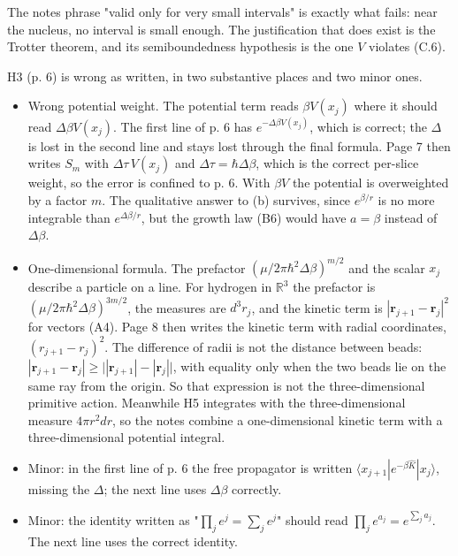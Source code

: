 \documentclass[11pt,a4paper]{article}
\providecommand{\tightlist}{\setlength{\itemsep}{0pt}\setlength{\parskip}{0pt}}
\begin{document}
The notes\textquotesingle{} phrase "valid only for very small intervals" is exactly what fails: near the nucleus, no interval is small enough. The justification that does exist is the Trotter theorem, and its semiboundedness hypothesis is the one \(V\) violates (C.6).

H3 (p. 6) is wrong as written, in two substantive places and two minor ones.

\begin{itemize}
\tightlist
\item
  Wrong potential weight. The potential term reads \(\beta V(x_j)\) where it should read \(\Delta\beta V(x_j)\). The first line of p. 6 has \(e^{-\Delta\beta V(x_j)}\), which is correct; the \(\Delta\) is lost in the second line and stays lost through the final formula. Page 7 then writes \(S_m\) with \(\Delta\tau\,V(x_j)\) and \(\Delta\tau=\hbar\Delta\beta\), which is the correct per-slice weight, so the error is confined to p. 6. With \(\beta V\) the potential is overweighted by a factor \(m\). The qualitative answer to (b) survives, since \(e^{\beta/r}\) is no more integrable than \(e^{\Delta\beta/r}\), but the growth law (B6) would have \(a=\beta\) instead of \(\Delta\beta\).
\item
  One-dimensional formula. The prefactor \((\mu/2\pi\hbar^2\Delta\beta)^{m/2}\) and the scalar \(x_j\) describe a particle on a line. For hydrogen in \(\mathbb R^3\) the prefactor is \((\mu/2\pi\hbar^2\Delta\beta)^{3m/2}\), the measures are \(d^3r_j\), and the kinetic term is \(|\mathbf r_{j+1}-\mathbf r_j|^2\) for vectors (A4). Page 8 then writes the kinetic term with radial coordinates, \((r_{j+1}-r_j)^2\). The difference of radii is not the distance between beads: \(|\mathbf r_{j+1}-\mathbf r_j|\ge\big||\mathbf r_{j+1}|-|\mathbf r_j|\big|\), with equality only when the two beads lie on the same ray from the origin. So that expression is not the three-dimensional primitive action. Meanwhile H5 integrates with the three-dimensional measure \(4\pi r^2dr\), so the notes combine a one-dimensional kinetic term with a three-dimensional potential integral.
\item
  Minor: in the first line of p. 6 the free propagator is written \(\langle x_{j+1}|e^{-\beta\hat K}|x_j\rangle\), missing the \(\Delta\); the next line uses \(\Delta\beta\) correctly.
\item
  Minor: the identity written as "\(\prod_je^{j}=\sum_je^{j}\)" should read \(\prod_je^{a_j}=e^{\sum_ja_j}\). The next line uses the correct identity.
\end{itemize}
\end{document}
